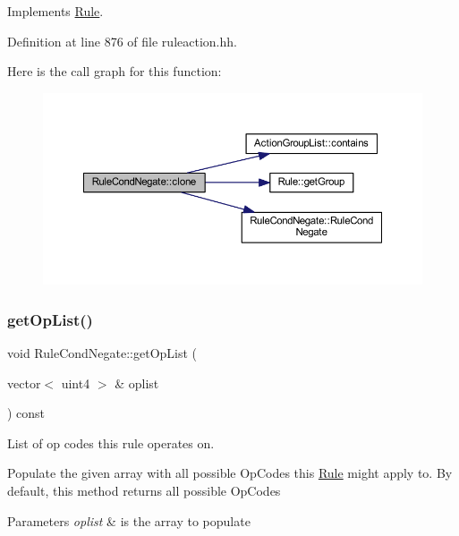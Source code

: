 Implements \mbox{\hyperlink{class_rule_a70de90a76461bfa7ea0b575ce3c11e4d}{Rule}}.



Definition at line 876 of file ruleaction.\+hh.

Here is the call graph for this function\+:
\nopagebreak
\begin{figure}[H]
\begin{center}
\leavevmode
\includegraphics[width=350pt]{class_rule_cond_negate_aebb1cb7788a492ef797489ea261a81a4_cgraph}
\end{center}
\end{figure}
\mbox{\label{class_rule_cond_negate_ac5ff9f8937c4667aebd7178f8231a64c}} 
\subsubsection{\texorpdfstring{getOpList()}{getOpList()}}
{\footnotesize\ttfamily void Rule\+Cond\+Negate\+::get\+Op\+List (\begin{DoxyParamCaption}\item[{vector$<$ uint4 $>$ \&}]{oplist }\end{DoxyParamCaption}) const\hspace{0.3cm}{\ttfamily [virtual]}}



List of op codes this rule operates on. 

Populate the given array with all possible Op\+Codes this \mbox{\hyperlink{class_rule}{Rule}} might apply to. By default, this method returns all possible Op\+Codes 
\begin{DoxyParams}{Parameters}
{\em oplist} & is the array to populate \\
\hline
\end{DoxyParams}


